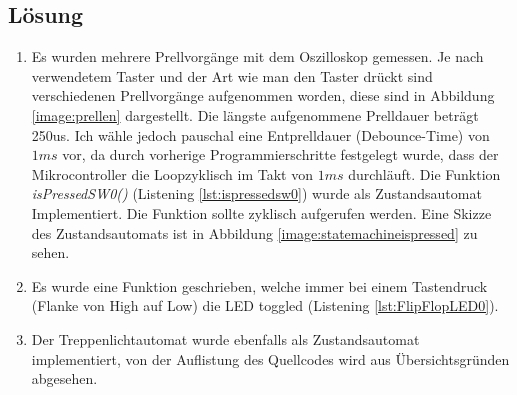 \subsection{Lösung}
\begin{enumerate}
		\item Es wurden mehrere Prellvorgänge mit dem Oszilloskop gemessen. Je nach verwendetem Taster und der Art wie man den Taster drückt sind verschiedenen Prellvorgänge aufgenommen worden, diese sind in Abbildung \ref{image:prellen} dargestellt.\newline
		Die längste aufgenommene Prelldauer beträgt 250us. Ich wähle jedoch pauschal eine Entprelldauer (\grqq Debounce-Time\grqq) von $1ms$ vor, da durch vorherige Programmierschritte festgelegt wurde, dass der Mikrocontroller die \grqq Loop\grqq zyklisch im Takt von $1ms$ durchläuft.\newline
		Die Funktion \textit{isPressedSW0()} (Listening \ref{lst:ispressedsw0}) wurde als Zustandsautomat Implementiert. Die Funktion sollte zyklisch aufgerufen werden. Eine Skizze des Zustandsautomats ist in Abbildung \ref{image:statemachineispressed} zu sehen.
		\item Es wurde eine Funktion geschrieben, welche immer bei einem Tastendruck (Flanke von High auf Low) die LED toggled (Listening \ref{lst:FlipFlopLED0}).
		\item Der Treppenlichtautomat wurde ebenfalls als Zustandsautomat implementiert, von der Auflistung des Quellcodes wird aus Übersichtsgründen abgesehen.
\end{enumerate}



